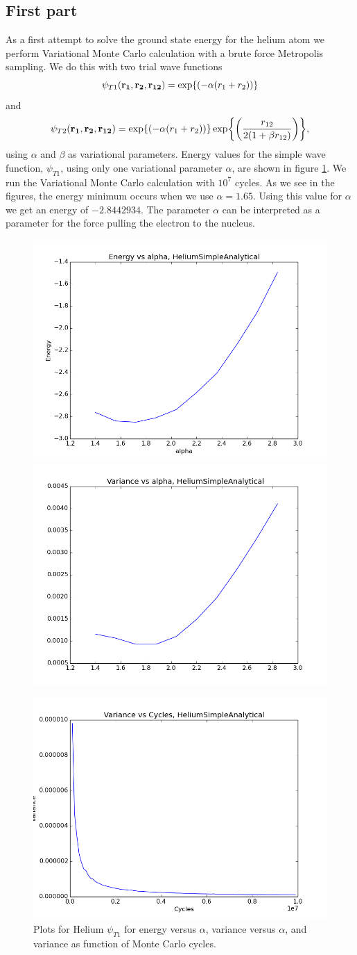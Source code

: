 \documentclass[x11names]{article}
\begin{document}
\subsection{First part}

	As a first attempt to solve the ground state energy for the helium
	atom we perform Variational Monte Carlo calculation with a brute force
	Metropolis sampling. We do this with two trial wave functions
	\[
	\psi_{T1}({\bf r_{1}},{\bf r_{2}},{\bf r_{12}})=\exp{\left(-\alpha(r_{1}+r_{2})\right)}
	\]
	and
	\[
	\psi_{T2}({\bf r_{1}},{\bf r_{2}},{\bf r_{12}})=\exp{\left(-\alpha(r_{1}+r_{2})\right)}\exp{\left(\frac{r_{12}}{2(1+\beta r_{12})}\right)},
	\]
	using $\alpha$ and $\beta$ as variational parameters. Energy values
	for the simple wave function, $\psi_{T1}$, using only one variational
	parameter $\alpha$, are shown in figure \ref{fig01:alpha_Simple}.
	We run the Variational Monte Carlo calculation with $10^{7}$ cycles.
	As we see in the figures, the energy minimum occurs when we use $\alpha=1.65$.
	Using this value for $\alpha$ we get an energy of $-2.8442934$.
	The parameter $\alpha$ can be interpreted as a parameter for the
	force pulling the electron to the nucleus.

	\begin{figure}
	\centering \includegraphics[width=0.45\linewidth]{../figures/EnergyVsAlphaHeliumSimpleAnalytical}
	\includegraphics[width=0.45\linewidth]{../figures/VarianceVsAlphaHeliumSimpleAnalytical}

	\includegraphics[width=0.45\linewidth]{../figures/VarianceNCyclesHeliumSimpleAnalytical}\protect\protect\caption{Plots for Helium $\psi_{T1}$ for energy versus $\alpha$, variance versus $\alpha$, and variance as function of Monte Carlo cycles.}
	\label{fig01:alpha_Simple}
	\end{figure}
\end{document}
